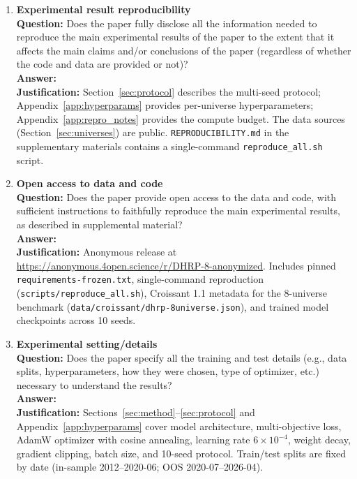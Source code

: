 \begin{enumerate}
\item {\bf Experimental result reproducibility}\\
\textbf{Question:} Does the paper fully disclose all the information needed to reproduce the main experimental results of the paper to the extent that it affects the main claims and/or conclusions of the paper (regardless of whether the code and data are provided or not)?\\
\textbf{Answer:} \answerYes{}\\
\textbf{Justification:} Section~\ref{sec:protocol} describes the multi-seed protocol; Appendix~\ref{app:hyperparams} provides per-universe hyperparameters; Appendix~\ref{app:repro_notes} provides the compute budget. The data sources (Section~\ref{sec:universes}) are public. \texttt{REPRODUCIBILITY.md} in the supplementary materials contains a single-command \texttt{reproduce\_all.sh} script.

\item {\bf Open access to data and code}\\
\textbf{Question:} Does the paper provide open access to the data and code, with sufficient instructions to faithfully reproduce the main experimental results, as described in supplemental material?\\
\textbf{Answer:} \answerYes{}\\
\textbf{Justification:} Anonymous release at \url{https://anonymous.4open.science/r/DHRP-8-anonymized}. Includes pinned \texttt{requirements-frozen.txt}, single-command reproduction (\texttt{scripts/reproduce\_all.sh}), Croissant 1.1 metadata for the 8-universe benchmark (\texttt{data/croissant/dhrp-8universe.json}), and trained model checkpoints across 10 seeds.

\item {\bf Experimental setting/details}\\
\textbf{Question:} Does the paper specify all the training and test details (e.g., data splits, hyperparameters, how they were chosen, type of optimizer, etc.) necessary to understand the results?\\
\textbf{Answer:} \answerYes{}\\
\textbf{Justification:} Sections~\ref{sec:method}--\ref{sec:protocol} and Appendix~\ref{app:hyperparams} cover model architecture, multi-objective loss, AdamW optimizer with cosine annealing, learning rate $6 \times 10^{-4}$, weight decay, gradient clipping, batch size, and 10-seed protocol. Train/test splits are fixed by date (in-sample 2012--2020-06; OOS 2020-07--2026-04).


\end{enumerate}
